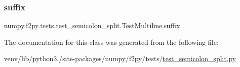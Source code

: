 \subsubsection{\texorpdfstring{suffix}{suffix}}
{\footnotesize\ttfamily numpy.\+f2py.\+tests.\+test\+\_\+semicolon\+\_\+split.\+Test\+Multiline.\+suffix\hspace{0.3cm}{\ttfamily [static]}}



The documentation for this class was generated from the following file\+:\begin{DoxyCompactItemize}
\item 
venv/lib/python3./site-\/packages/numpy/f2py/tests/\hyperlink{test__semicolon__split_8py}{test\+\_\+semicolon\+\_\+split.\+py}\end{DoxyCompactItemize}
